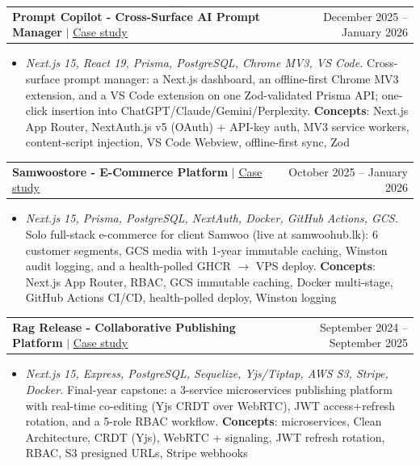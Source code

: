 \documentclass[letterpaper,10pt]{article}
\makeatletter
\newcommand{\resumeItem}[1]{
  \item\small{
    {#1 \vspace{-2pt}}
  }
}
\newcommand{\resumeProjectHeading}[2]{
    \item
    \begin{tabular*}{0.97\textwidth}{l@{\extracolsep{\fill}}r}
      \small#1 & #2 \\
    \end{tabular*}\vspace{-7pt}
}
\newcommand{\resumeItemListStart}{\begin{itemize}}
\newcommand{\resumeItemListEnd}{\end{itemize}\vspace{-5pt}}
\makeatother
\begin{document}
      \resumeProjectHeading
          {\textbf{Prompt Copilot - Cross-Surface AI Prompt Manager} $|$ \href{https://ifham.dev/projects/prompt-copilot}{\underline{Case study}}}{December 2025 -- January 2026}
          \resumeItemListStart
            \resumeItem{\emph{Next.js 15, React 19, Prisma, PostgreSQL, Chrome MV3, VS Code.} Cross-surface prompt manager: a Next.js dashboard, an offline-first Chrome MV3 extension, and a VS Code extension on one Zod-validated Prisma API; one-click insertion into ChatGPT/Claude/Gemini/Perplexity. \textbf{Concepts}: Next.js App Router, NextAuth.js v5 (OAuth) + API-key auth, MV3 service workers, content-script injection, VS Code Webview, offline-first sync, Zod}
          \resumeItemListEnd

      \resumeProjectHeading
          {\textbf{Samwoostore - E-Commerce Platform} $|$ \href{https://ifham.dev/projects/samwoostore}{\underline{Case study}}}{October 2025 -- January 2026}
          \resumeItemListStart
            \resumeItem{\emph{Next.js 15, Prisma, PostgreSQL, NextAuth, Docker, GitHub Actions, GCS.} Solo full-stack e-commerce for client Samwoo (live at samwoohub.lk): 6 customer segments, GCS media with 1-year immutable caching, Winston audit logging, and a health-polled GHCR $\to$ VPS deploy. \textbf{Concepts}: Next.js App Router, RBAC, GCS immutable caching, Docker multi-stage, GitHub Actions CI/CD, health-polled deploy, Winston logging}
          \resumeItemListEnd

      \resumeProjectHeading
          {\textbf{Rag Release - Collaborative Publishing Platform} $|$ \href{https://ifham.dev/projects/rag-release}{\underline{Case study}}}{September 2024 -- September 2025}
          \resumeItemListStart
            \resumeItem{\emph{Next.js 15, Express, PostgreSQL, Sequelize, Yjs/Tiptap, AWS S3, Stripe, Docker.} Final-year capstone: a 3-service microservices publishing platform with real-time co-editing (Yjs CRDT over WebRTC), JWT access+refresh rotation, and a 5-role RBAC workflow. \textbf{Concepts}: microservices, Clean Architecture, CRDT (Yjs), WebRTC + signaling, JWT refresh rotation, RBAC, S3 presigned URLs, Stripe webhooks}
          \resumeItemListEnd
\end{document}
